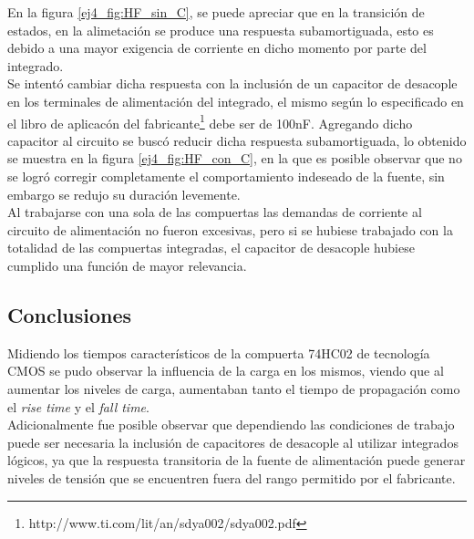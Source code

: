 En la figura \ref{ej4_fig:HF_sin_C}, se puede apreciar que en la transici\'on de estados, en la alimetaci\'on se produce una respuesta subamortiguada, esto es debido a una mayor exigencia de corriente en dicho momento por parte del integrado.\\
Se intent\'o cambiar dicha respuesta con la inclusi\'on de un capacitor de desacople en los terminales de alimentaci\'on del integrado, el mismo seg\'un lo especificado en el libro de aplicac\'on  del fabricante\footnote{http://www.ti.com/lit/an/sdya002/sdya002.pdf} debe ser de 100nF. Agregando dicho capacitor al circuito se busc\'o reducir dicha respuesta subamortiguada, lo obtenido se muestra en la figura \ref{ej4_fig:HF_con_C}, en la que es posible observar que no se logr\'o corregir completamente el comportamiento indeseado de la fuente, sin embargo se redujo su duraci\'on levemente.\\
Al trabajarse con una sola de las compuertas las demandas de corriente al circuito de alimentaci\'on no fueron excesivas, pero si se hubiese trabajado con la totalidad de las compuertas integradas, el capacitor de desacople hubiese cumplido una funci\'on de mayor relevancia.
\subsection{Conclusiones}
\noindent
Midiendo los tiempos caracter\'isticos de la compuerta 74HC02 de tecnolog\'ia CMOS se pudo observar la influencia de la carga en los mismos, viendo que al aumentar los niveles de carga, aumentaban tanto el tiempo de propagaci\'on como el \textit{rise time} y el \textit{fall time}.\\
Adicionalmente fue posible observar que dependiendo las condiciones de trabajo puede ser necesaria la inclusi\'on de capacitores de desacople al utilizar integrados l\'ogicos, ya que la respuesta transitoria de la fuente de alimentaci\'on puede generar niveles de tensi\'on que se encuentren fuera del rango permitido por el fabricante. 